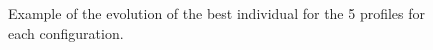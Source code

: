 \documentclass[runningheads]{llncs}
\begin{document}
\begin{figure}[htb]
\centering

\caption{Example of the evolution of the best individual for the 5 profiles for each configuration.}

\label{fig:boxplots}
\end{figure}

\newpage
\end{document}
